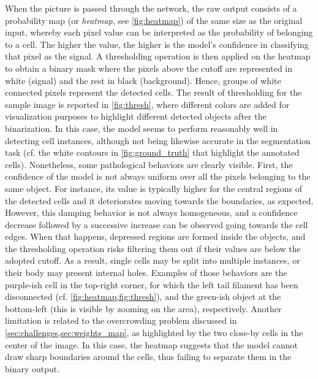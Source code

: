 When the picture is passed through the network, the raw output consists of a probability map (or \textit{heatmap}, see \cref{fig:heatmap}) of the same size as the original input, whereby each pixel value can be interpreted as the probability of belonging to a cell. 
The higher the value, the higher is the model's confidence in classifying that pixel as the signal. 
A thresholding operation is then applied on the heatmap to obtain a binary mask where the pixels above the cutoff are represented in white (signal) and the rest in black (background).
Hence, groups of white connected pixels represent the detected cells. 
The result of thresholding for the sample image is reported in \cref{fig:thresh}, where different colors are added for visualization purposes to highlight different detected objects after the binarization.
In this case, the model seems to perform reasonably well in detecting cell instances, although not being likewise accurate in the segmentation task (cf. the white contours in \cref{fig:ground_truth} that highlight the annotated cells).
Nonetheless, some pathological behaviors are clearly visible.
First, the confidence of the model is not always uniform over all the pixels belonging to the same object.
For instance, its value is typically higher for the central regions of the detected cells and it deteriorates moving towards the boundaries, as expected.
However, this damping behavior is not always homogeneous, and a confidence decrease followed by a successive increase can be observed going towards the cell edges.
When that happens, depressed regions are formed inside the objects, and the thresholding operation risks filtering them out if their values are below the adopted cutoff.
As a result, single cells may be split into multiple instances, or their body may present internal holes.
Examples of those behaviors are the purple-ish cell in the top-right corner, for which the left tail filament has been disconnected (cf. \cref{fig:heatmap,fig:thresh}), and the green-ish object at the bottom-left (this is visible by zooming on the area), respectively.
Another limitation is related to the overcrowding problem discussed in \cref{sec:challenges,sec:weights_map}, as highlighted by the two close-by cells in the center of the image.
In this case, the heatmap suggests that the model cannot draw sharp boundaries around the cells, thus failing to separate them in the binary output. 

